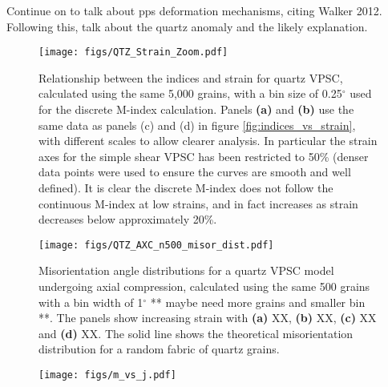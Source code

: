 \documentclass[a4paper,12pt]{report}
\numberwithin{equation}{chapter}
\begin{document}
Continue on to talk about pps deformation mechanisms, citing Walker 2012. Following this, talk about the quartz anomaly and the likely explanation.      


\begin{figure}[h]
  \centering
    \texttt{[image: figs/QTZ\_Strain\_Zoom.pdf]}
  \caption[Relation of indices to strain (quartz VPSC)]{Relationship between the indices and strain for quartz VPSC, calculated using the same 5,000 grains, with a bin size of 0.25$^\circ$ used for the discrete M-index calculation. Panels \textbf{(a)} and \textbf{(b)} use the same data as panels (c) and (d) in figure \ref{fig:indices_vs_strain}, with different scales to allow clearer analysis. In particular the strain axes for the simple shear VPSC has been restricted to 50\% (denser data points were used to ensure the curves are smooth and well defined). It is clear the discrete M-index does not follow the continuous M-index at low strains, and in fact increases as strain decreases below approximately 20\%.}
  \label{fig:indices_vs_strain_qtz}
\end{figure} 

\begin{figure}[h]
  \centering
    \texttt{[image: figs/QTZ\_AXC\_n500\_misor\_dist.pdf]}
  \caption[Misorientation angle distribution (quartz VPSC)]{Misorientation angle distributions for a quartz VPSC model undergoing axial compression, calculated using the same 500 grains with a bin width of 1$^{\circ}$ ** maybe need more grains and smaller bin **. The panels show increasing strain with \textbf{(a)} XX, \textbf{(b)} XX, \textbf{(c)} XX and \textbf{(d)} XX. The solid line shows the theoretical misorientation distribution for a random fabric of quartz grains.} 
  \label{fig:qtz_misorientation_dist}
\end{figure} 

\begin{figure}[h]
  \centering
    \texttt{[image: figs/m\_vs\_j.pdf]}
  \caption[Relationship of M- and J-indices]{} 
  \label{fig:m_vs_j}
\end{figure} 
  
\end{document}
